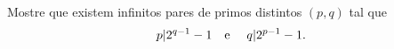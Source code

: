 Mostre que existem infinitos pares de primos distintos $(p, q)$ tal que \[p | 2^{q-1} - 1 \text{\quad e \quad} q | 2^{p-1}-1.\]
